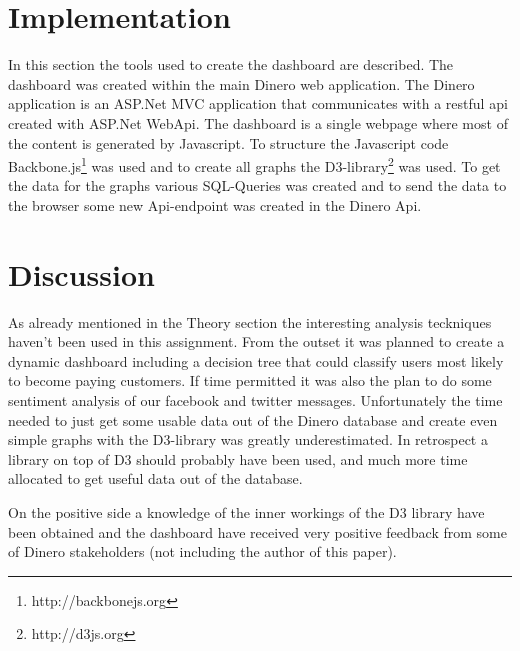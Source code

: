 \documentclass{acm_proc_article-sp}
\begin{document}
\section{Implementation}

In this section the tools used to create the dashboard are described. The dashboard was created within the main Dinero web application. The Dinero application is an ASP.Net MVC application that communicates with a restful api created with ASP.Net WebApi. The dashboard is a single webpage where most of the content is generated by Javascript. To structure the Javascript code Backbone.js\footnote{http://backbonejs.org} was used and to create all graphs the D3-library\footnote{http://d3js.org} was used. To get the data for the graphs various SQL-Queries was created and to send the data to the browser some new Api-endpoint was created in the Dinero Api.


\section{Discussion}

As already mentioned in the Theory section the interesting analysis teckniques haven't been used in this assignment. From the outset it was planned to create a dynamic dashboard including a decision tree that could classify users most likely to become paying customers. If time permitted it was also the plan to do some sentiment analysis of our facebook and twitter messages. Unfortunately the time needed to just get some usable data out of the Dinero database and create even simple graphs with the D3-library was greatly underestimated. In retrospect a library on top of D3 should probably have been used, and much more time allocated to get useful data out of the database. 

On the positive side a knowledge of the inner workings of the D3 library have been obtained and the dashboard have received very positive feedback from some of Dinero stakeholders (not including the author of this paper).

\balancecolumns
\end{document}
